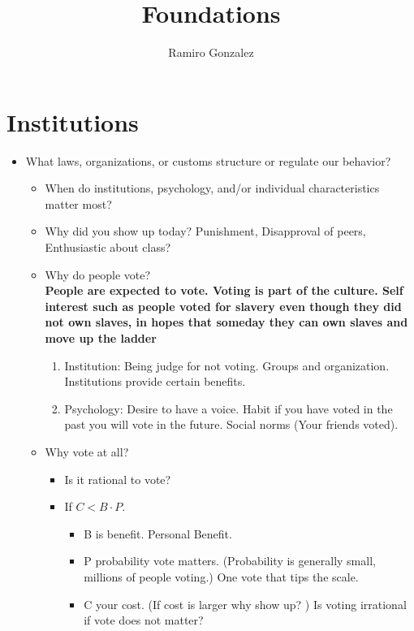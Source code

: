 \documentclass{article}
\title{Foundations}
\author{Ramiro Gonzalez }
\date{}
\begin{document}
\maketitle

\section*{Institutions}
\begin{itemize}
    \item What laws, organizations, or customs structure or regulate our behavior? 
    \begin{itemize}
        \item When do institutions, psychology, and/or individual characteristics matter most? 
        \item Why did you show up today? Punishment, Disapproval of peers, Enthusiastic about class? 
        \item Why do people vote? \\
        \textbf{People are expected to vote.  Voting is part of the culture. Self interest such as people voted for slavery even though they did not own slaves, in hopes that someday they can own slaves and move up the ladder}
        \begin{enumerate}
            \item Institution: Being judge for not voting. Groups and organization. Institutions provide certain benefits. 
            \item Psychology: Desire to have a voice. Habit if you have voted in the past you will vote in the future. Social norms (Your friends voted). 
        \end{enumerate}
        \item Why vote at all?
        \begin{itemize}
            \item Is it rational to vote?
            \item If $C < B\cdot P$. 
            \begin{itemize}
                \item B is benefit. Personal Benefit. 
                \item P probability vote matters. (Probability is generally small, millions of people voting.) One vote that tips the scale. 
                \item C your cost. (If cost is larger why show up? ) Is voting irrational if vote does not matter? 
            \end{itemize}

\end{itemize}
\end{itemize}
\end{itemize}
\end{document}
